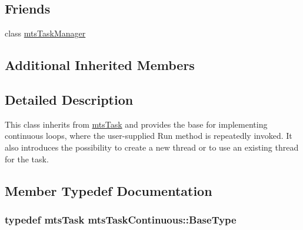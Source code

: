 \subsection*{Friends}
\begin{DoxyCompactItemize}
\item 
class \hyperlink{classmts_task_continuous_a21d47396ed8d4c10b5acd6a083b219f9}{mts\-Task\-Manager}
\end{DoxyCompactItemize}
\subsection*{Additional Inherited Members}


\subsection{Detailed Description}
This class inherits from \hyperlink{classmts_task}{mts\-Task} and provides the base for implementing continuous loops, where the user-\/supplied Run method is repeatedly invoked. It also introduces the possibility to create a new thread or to use an existing thread for the task. 

\subsection{Member Typedef Documentation}
\hypertarget{classmts_task_continuous_ab1c75a7d5ac83cba5bc21ebd4a31d804}{
\subsubsection[{Base\-Type}]{\setlength{\rightskip}{0pt plus 5cm}typedef {\bf mts\-Task} {\bf mts\-Task\-Continuous\-::\-Base\-Type}}}\label{classmts_task_continuous_ab1c75a7d5ac83cba5bc21ebd4a31d804}


